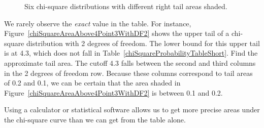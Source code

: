 \begin{figure}
{\label{chiSquareAreaAbove10WithDF4}
}
\caption{\textbf{} Six chi-square distributions with different right tail areas shaded.}
\label{arrayOfFigureAreasForChiSquareDistribution}
\end{figure}

\begin{example}{We rarely observe the \emph{exact} value in the table. For instance, Figure~\ref{chiSquareAreaAbove4Point3WithDF2} shows the upper tail of a chi-square distribution with 2 degrees of freedom. The lower bound for this upper tail is at 4.3, which does not fall in Table~\ref{chiSquareProbabilityTableShort}. Find the approximate tail area.}
The cutoff 4.3 falls between the second and third columns in the 2 degrees of freedom row. Because these columns correspond to tail areas of 0.2 and 0.1, we can be certain that the area shaded in Figure~\ref{chiSquareAreaAbove4Point3WithDF2} is between 0.1 and 0.2.
\end{example}

Using a calculator or statistical software allows us to get more precise areas under the chi-square curve than we can get from the table alone.


